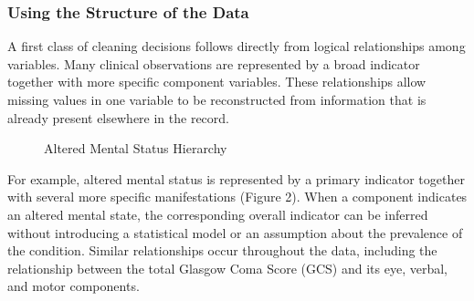 \documentclass[10pt,letterpaper]{article}
\begin{document}
\subsubsection{Using the Structure of the Data}

A first class of cleaning decisions follows directly from logical relationships among variables. Many clinical observations are represented by a broad indicator together with more specific component variables. These relationships allow missing values in one variable to be reconstructed from information that is already present elsewhere in the record.\\

\begin{figure}[htbp]
    \centering
    \caption{Altered Mental Status Hierarchy}
    \label{fig:ams_hierarchy}
\end{figure}



For example, altered mental status is represented by a primary indicator together with several more specific manifestations (Figure 2). When a component indicates an altered mental state, the corresponding overall indicator can be inferred without introducing a statistical model or an assumption about the prevalence of the condition. Similar relationships occur throughout the data, including the relationship between the total Glasgow Coma Score (GCS) and its eye, verbal, and motor components. \\
\end{document}
